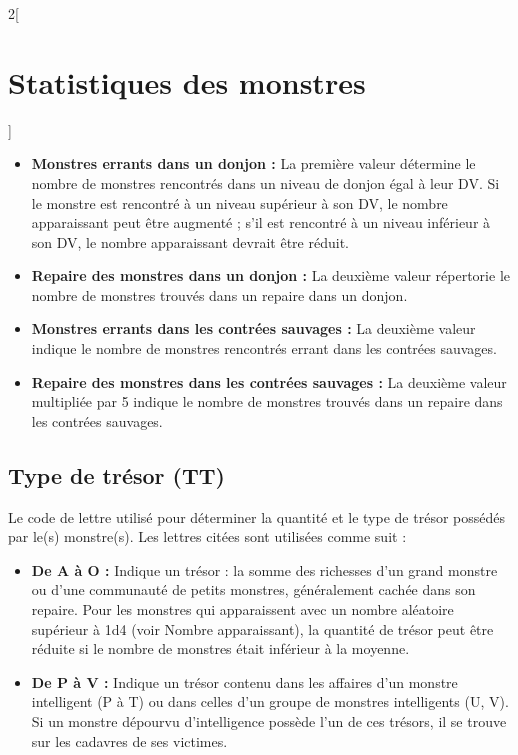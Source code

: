\begin{multicols}{2}[\section*{Statistiques des monstres}\label{statistiques-des-monstres}]
\begin{itemize}
\tightlist
\item
  \textbf{Monstres errants dans un donjon :} La première valeur
  détermine le nombre de monstres rencontrés dans un niveau de donjon
  égal à leur DV. Si le monstre est rencontré à un niveau supérieur à
  son DV, le nombre apparaissant peut être augmenté ; s'il est rencontré
  à un niveau inférieur à son DV, le nombre apparaissant devrait être
  réduit.
\item
  \textbf{Repaire des monstres dans un donjon :} La deuxième valeur
  répertorie le nombre de monstres trouvés dans un repaire dans un
  donjon.
\item 
	\textbf{Monstres errants dans les contrées sauvages :} La deuxième valeur
	indique le nombre de monstres rencontrés errant dans les contrées
	sauvages.
\item
  \textbf{Repaire des monstres dans les contrées sauvages :} La deuxième
  valeur multipliée par 5 indique le nombre de monstres trouvés dans un
  repaire dans les contrées sauvages.
\end{itemize}

\subsection*{Type de trésor (TT)}\label{type-de-truxe9sor-tt}

Le code de lettre utilisé pour déterminer la quantité et le type de
trésor possédés par le(s) monstre(s). Les lettres
citées sont utilisées comme suit :

\begin{itemize}
\tightlist
\item
  \textbf{De A à O :} Indique un trésor : la somme des richesses d'un
  grand monstre ou d'une communauté de petits monstres, généralement
  cachée dans son repaire. Pour les monstres qui apparaissent avec un
  nombre aléatoire supérieur à 1d4 (voir Nombre apparaissant), la
  quantité de trésor peut être réduite si le nombre de monstres était
  inférieur à la moyenne.
\item
  \textbf{De P à V :} Indique un trésor contenu dans les affaires d'un
  monstre intelligent (P à T) ou dans celles d'un groupe de monstres
  intelligents (U, V). Si un monstre dépourvu d'intelligence possède
  l'un de ces trésors, il se trouve sur les cadavres de ses victimes.
\end{itemize}
\end{multicols}

